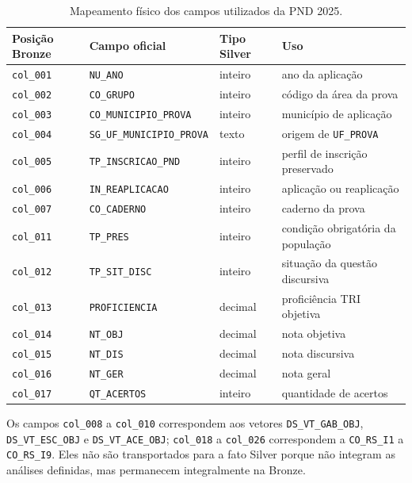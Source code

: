 \begin{table}[H]
\centering
\scriptsize
\caption{Mapeamento físico dos campos utilizados da PND 2025.}
\label{tab:ap-pnd-layout}
\renewcommand{\arraystretch}{1.12}
\begin{tabular}{|p{2.5cm}|p{5.0cm}|p{3.2cm}|p{4.4cm}|}
\hline
\textbf{Posição Bronze} & \textbf{Campo oficial} & \textbf{Tipo Silver} & \textbf{Uso} \\ \hline
\texttt{col\_001} & \texttt{NU\_ANO} & inteiro & ano da aplicação \\ \hline
\texttt{col\_002} & \texttt{CO\_GRUPO} & inteiro & código da área da prova \\ \hline
\texttt{col\_003} & \texttt{CO\_MUNICIPIO\_PROVA} & inteiro & município de aplicação \\ \hline
\texttt{col\_004} & \texttt{SG\_UF\_MUNICIPIO\_PROVA} & texto & origem de \texttt{UF\_PROVA} \\ \hline
\texttt{col\_005} & \texttt{TP\_INSCRICAO\_PND} & inteiro & perfil de inscrição preservado \\ \hline
\texttt{col\_006} & \texttt{IN\_REAPLICACAO} & inteiro & aplicação ou reaplicação \\ \hline
\texttt{col\_007} & \texttt{CO\_CADERNO} & inteiro & caderno da prova \\ \hline
\texttt{col\_011} & \texttt{TP\_PRES} & inteiro & condição obrigatória da população \\ \hline
\texttt{col\_012} & \texttt{TP\_SIT\_DISC} & inteiro & situação da questão discursiva \\ \hline
\texttt{col\_013} & \texttt{PROFICIENCIA} & decimal & proficiência TRI objetiva \\ \hline
\texttt{col\_014} & \texttt{NT\_OBJ} & decimal & nota objetiva \\ \hline
\texttt{col\_015} & \texttt{NT\_DIS} & decimal & nota discursiva \\ \hline
\texttt{col\_016} & \texttt{NT\_GER} & decimal & nota geral \\ \hline
\texttt{col\_017} & \texttt{QT\_ACERTOS} & inteiro & quantidade de acertos \\ \hline
\end{tabular}
\end{table}

Os campos \texttt{col\_008} a \texttt{col\_010} correspondem aos vetores \texttt{DS\_VT\_GAB\_OBJ}, \texttt{DS\_VT\_ESC\_OBJ} e \texttt{DS\_VT\_ACE\_OBJ}; \texttt{col\_018} a \texttt{col\_026} correspondem a \texttt{CO\_RS\_I1} a \texttt{CO\_RS\_I9}. Eles não são transportados para a fato Silver porque não integram as análises definidas, mas permanecem integralmente na Bronze.
